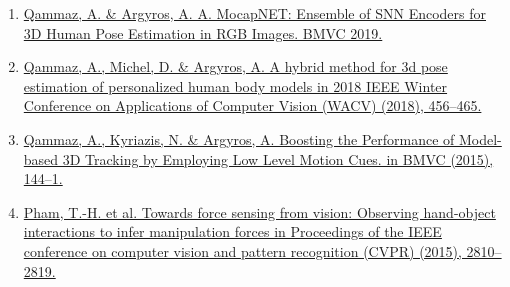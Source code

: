 \documentclass[a4,8pt]{article}
\begin{document}
\begin{enumerate}[itemsep=-1mm]
  
  \item \href{http://users.ics.forth.gr/~argyros/mypapers/2019_09_BMVC_mocapnet.pdf}{Qammaz, A. \& Argyros, A. A. MocapNET: Ensemble of SNN Encoders for 3D Human Pose Estimation in RGB Images. BMVC 2019.}

  
  \item \href{http://users.ics.forth.gr/~argyros/mypapers/2018_03_WACV_personalizedHumanPose.pdf}{Qammaz, A., Michel, D. \& Argyros, A. A hybrid method for 3d pose estimation of personalized human body models in 2018 IEEE Winter Conference on Applications of Computer Vision (WACV) (2018), 456–465.}

  
  \item \href{http://users.ics.forth.gr/~argyros/mypapers/2015_09_BMVC_fect.pdf}{Qammaz, A., Kyriazis, N. \& Argyros, A. Boosting the Performance of Model-based 3D Tracking by Employing Low Level Motion Cues. in BMVC (2015), 144–1.}
  
  \item \href{http://users.ics.forth.gr/~argyros/mypapers/2015_06_CVPR_fsv.pdf}{Pham, T.-H. et al. Towards force sensing from vision: Observing hand-object interactions to infer manipulation forces in Proceedings of the IEEE conference on computer vision and pattern recognition (CVPR) (2015), 2810–2819.}
\end{enumerate}
\vspace{-0.4cm}

\end{document}
